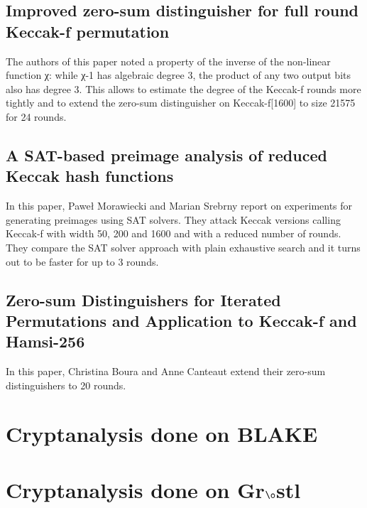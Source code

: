 \subsection{Improved zero-sum distinguisher for full round Keccak-f permutation} \cite{00026}
The authors of this paper noted a property of the inverse of the non-linear function χ: while χ-1 has algebraic degree 3,
the product of any two output bits also has degree 3. This allows to estimate the degree of the Keccak-f rounds more tightly 
and to extend the zero-sum distinguisher on Keccak-f[1600] to size 21575 for 24 rounds.

\subsection{A SAT-based preimage analysis of reduced Keccak hash functions} \cite{00027}
In this paper, Paweł Morawiecki and Marian Srebrny report on experiments for generating preimages using SAT solvers. 
They attack Keccak versions calling Keccak-f with width 50, 200 and 1600 and with a reduced number of rounds. 
They compare the SAT solver approach with plain exhaustive search and it turns out to be faster for up to 3 rounds.

\subsection{Zero-sum Distinguishers for Iterated Permutations and Application to Keccak-f and Hamsi-256} \cite{00028}
In this paper, Christina Boura and Anne Canteaut extend their zero-sum distinguishers to 20 rounds.

\section{Cryptanalysis done on BLAKE}
\section{Cryptanalysis done on Gr$\o$stl}
